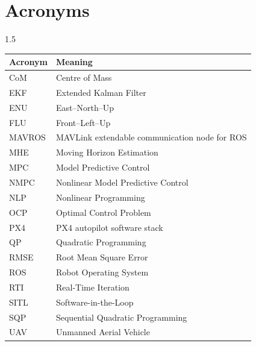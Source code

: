 \chapter*{\centering Acronyms}

\begin{spacing}{1.5}
\setlength{\parskip}{0.1in}
\begin{table}[ht]
\centering
\begin{tabular}{@{}ll@{}}
\toprule
\textbf{Acronym} & \textbf{Meaning} \\
\midrule
CoM & Centre of Mass \\
EKF & Extended Kalman Filter \\
ENU & East--North--Up \\
FLU & Front--Left--Up \\
MAVROS & MAVLink extendable communication node for ROS \\
MHE & Moving Horizon Estimation \\
MPC & Model Predictive Control \\
NMPC & Nonlinear Model Predictive Control \\
NLP & Nonlinear Programming \\
OCP & Optimal Control Problem \\
PX4 & PX4 autopilot software stack \\
QP & Quadratic Programming \\
RMSE & Root Mean Square Error \\
ROS & Robot Operating System \\
RTI & Real-Time Iteration \\
SITL & Software-in-the-Loop \\
SQP & Sequential Quadratic Programming \\
UAV & Unmanned Aerial Vehicle \\
\bottomrule
\end{tabular}
\end{table}
\end{spacing}
\newpage

